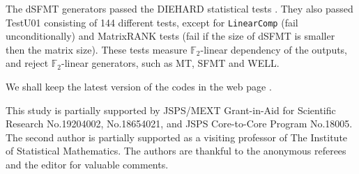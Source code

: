 \documentclass{svmult}
\begin{document}

The dSFMT generators passed the DIEHARD statistical tests \cite{diehard}.
They also passed TestU01 \cite{TESTU01} consisting of
144 different tests, except for 
\texttt{LinearComp} (fail unconditionally) and 
MatrixRANK tests (fail if the size of dSFMT is smaller then 
the matrix size). These tests measure ${\mathbb F}_2$-linear 
dependency of the outputs, and reject ${\mathbb F}_2$-linear generators, 
such as MT, SFMT and WELL.

We shall keep the latest version of the codes in the web page \cite{web:SFMT}.


\begin{acknowledgement}
This study is partially
supported by JSPS/MEXT Grant-in-Aid for Scientific Research
No.19204002, No.18654021, and JSPS Core-to-Core Program
No.18005. The second author is partially supported
as a visiting professor of The Institute of Statistical 
Mathematics. The authors are thankful to the anonymous 
referees and the editor for valuable comments.
\end{acknowledgement}
\end{document}
